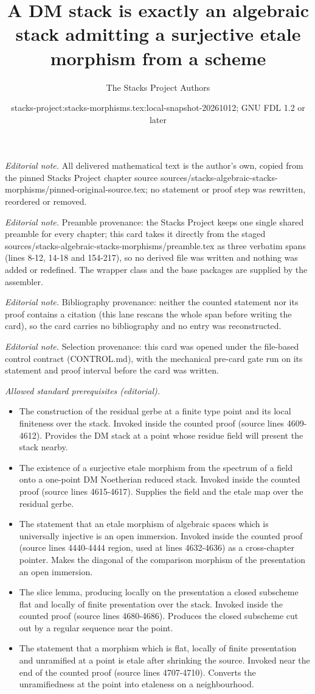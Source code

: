 \documentclass[10pt,a4paper]{amsart}
\title{A DM stack is exactly an algebraic stack admitting a surjective etale morphism from a scheme}
\author{The Stacks Project Authors}
\date{stacks-project:stacks-morphisms.tex:local-snapshot-20261012; GNU FDL 1.2 or later}
\theoremstyle{plain}
\theoremstyle{definition}
\theoremstyle{remark}
\numberwithin{equation}{subsection}
\begin{document}
\maketitle
\noindent\textit{Editorial note.} All delivered mathematical text is the author's own, copied from the pinned Stacks Project chapter source sources/stacks-algebraic-stacks-morphisms/pinned-original-source.tex; no statement or proof step was rewritten, reordered or removed.\par\medskip
\noindent\textit{Editorial note.} Preamble provenance: the Stacks Project keeps one single shared preamble for every chapter; this card takes it directly from the staged sources/stacks-algebraic-stacks-morphisms/preamble.tex as three verbatim spans (lines 8-12, 14-18 and 154-217), so no derived file was written and nothing was added or redefined. The wrapper class and the base packages are supplied by the assembler.\par\medskip
\noindent\textit{Editorial note.} Bibliography provenance: neither the counted statement nor its proof contains a citation (this lane rescans the whole span before writing the card), so the card carries no bibliography and no entry was reconstructed.\par\medskip
\noindent\textit{Editorial note.} Selection provenance: this card was opened under the file-based control contract (CONTROL.md), with the mechanical pre-card gate run on its statement and proof interval before the card was written.\par\medskip
\noindent\textit{Allowed standard prerequisites (editorial).}\begin{itemize}
\item The construction of the residual gerbe at a finite type point and its local finiteness over the stack. Invoked inside the counted proof (source lines 4609-4612). Provides the DM stack at a point whose residue field will present the stack nearby.
\item The existence of a surjective etale morphism from the spectrum of a field onto a one-point DM Noetherian reduced stack. Invoked inside the counted proof (source lines 4615-4617). Supplies the field and the etale map over the residual gerbe.
\item The statement that an etale morphism of algebraic spaces which is universally injective is an open immersion. Invoked inside the counted proof (source lines 4440-4444 region, used at lines 4632-4636) as a cross-chapter pointer. Makes the diagonal of the comparison morphism of the presentation an open immersion.
\item The slice lemma, producing locally on the presentation a closed subscheme flat and locally of finite presentation over the stack. Invoked inside the counted proof (source lines 4680-4686). Produces the closed subscheme cut out by a regular sequence near the point.
\item The statement that a morphism which is flat, locally of finite presentation and unramified at a point is etale after shrinking the source. Invoked near the end of the counted proof (source lines 4707-4710). Converts the unramifiedness at the point into etaleness on a neighbourhood.
\end{itemize}\medskip
\end{document}
